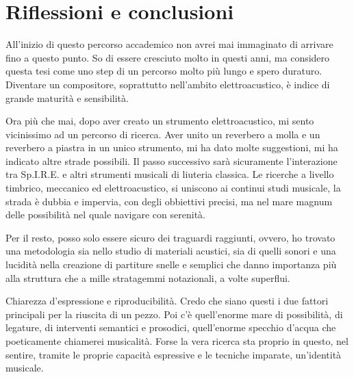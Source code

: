 
\chapter{Riflessioni e conclusioni}
\label{chp:Riflessioni e conclusioni}

All'inizio di questo percorso accademico non avrei mai immaginato di arrivare fino a questo punto. So di essere cresciuto molto in questi anni, ma considero questa tesi come uno step di un percorso molto più lungo e spero duraturo. Diventare un compositore, soprattutto nell'ambito elettroacustico, è indice di grande maturità e sensibilità.

Ora più che mai, dopo aver creato un strumento elettroacustico, mi sento vicinissimo ad un percorso di ricerca. Aver unito un reverbero a molla e un reverbero a piastra in un unico strumento, mi ha dato molte suggestioni, mi ha indicato altre strade possibili. Il passo successivo sarà sicuramente l'interazione tra Sp.I.R.E. e altri strumenti musicali di liuteria classica. Le ricerche a livello timbrico, meccanico ed elettroacustico, si uniscono ai continui studi musicale, la strada è dubbia e impervia, con degli obbiettivi precisi, ma nel mare magnum delle possibilità nel quale navigare con serenità.

Per il resto, posso solo essere sicuro dei traguardi raggiunti, ovvero, ho trovato una metodologia sia nello studio di materiali acustici, sia di quelli sonori e una lucidità nella creazione di partiture snelle e semplici che danno importanza più alla struttura che a mille stratagemmi notazionali, a volte superflui. 

Chiarezza d'espressione e riproducibilità. Credo che siano questi i due fattori principali per la riuscita di un pezzo. Poi c'è quell'enorme mare di possibilità, di legature, di interventi semantici e prosodici, quell'enorme specchio d'acqua che poeticamente chiamerei musicalità. Forse la vera ricerca sta proprio in questo, nel sentire, tramite le proprie capacità espressive e le tecniche imparate, un'identità musicale.